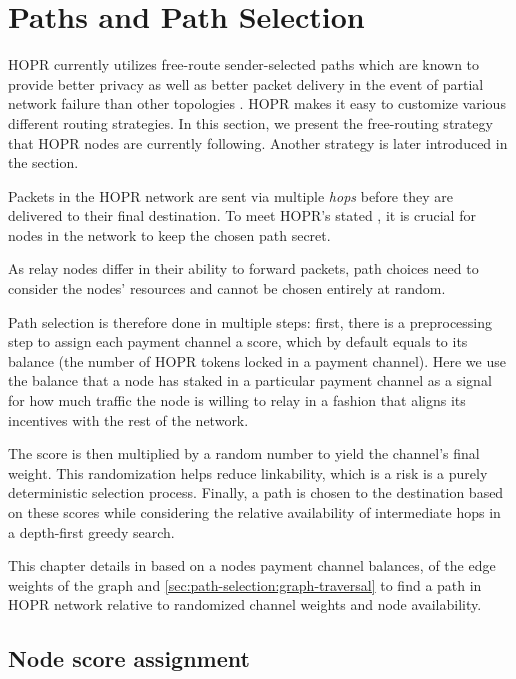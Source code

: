 \section{Paths and Path Selection}
\label{sec:path-selection}
HOPR currently utilizes free-route sender-selected paths which are known to provide better privacy as well as better packet delivery in the event of partial network failure than other topologies \cite{Dingledine2004SynchronousBF}. HOPR makes it easy to customize various different routing strategies. In this section, we present the free-routing strategy that HOPR nodes are currently following. Another strategy is later introduced in the  section.

Packets in the HOPR network are sent via multiple \textit{hops} before they are delivered to their final destination. To meet HOPR's stated , it is crucial for nodes in the network to keep the chosen path secret.

As relay nodes differ in their ability to forward packets, path choices need to consider the nodes' resources and cannot be chosen entirely at random.

Path selection is therefore done in multiple steps: first, there is a preprocessing step to assign each payment channel a score, which by default equals to its balance (the number of HOPR tokens locked in a payment channel). Here we use the balance that a node has staked in a particular payment channel as a signal for how much traffic the node is willing to relay in a fashion that aligns its incentives with the rest of the network.

The score is then multiplied by a random number to yield the channel's final weight. This randomization helps reduce linkability, which is a risk is a purely deterministic selection process. Finally, a path is chosen to the destination based on these scores while considering the relative availability of intermediate hops in a depth-first greedy search.

This chapter details in  based on a nodes payment channel balances,  of the edge weights of the graph and \ref{sec:path-selection:graph-traversal} to find a path in HOPR network relative to randomized channel weights and node availability.

\subsection{Node score assignment}
\label{sec:path-selection:node-score}

